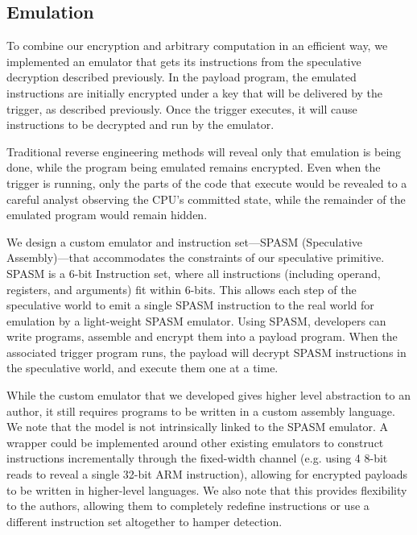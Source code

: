 \subsection{Emulation}

To combine our encryption and arbitrary computation in an efficient way, we
implemented an emulator that gets its instructions from the speculative
decryption described previously. In the payload program, the emulated
instructions are initially encrypted under a key that will be delivered by the
trigger, as described previously. Once the trigger executes, it will cause
instructions to be decrypted and run by the emulator.

Traditional reverse engineering methods will reveal only that
emulation is being done, while the program being emulated remains encrypted.
Even when the trigger is running, only the parts of the code that execute would
be revealed to a careful analyst observing the CPU's committed state, while the
remainder of the emulated program would remain hidden.

We design a custom emulator and instruction set---SPASM (Speculative
Assembly)---that accommodates the constraints of our speculative primitive.
SPASM is a 6-bit Instruction set, where all instructions (including operand,
registers, and arguments) fit within 6-bits. This allows each step of the
speculative world to emit a single SPASM instruction to the real world for
emulation by a light-weight SPASM emulator. Using SPASM, developers can write
programs, assemble and encrypt them into a payload program. When the
associated trigger program runs, the payload will decrypt SPASM instructions in
the speculative world, and execute them one at a time.



While the custom emulator that we developed gives higher level abstraction to
an author, it still requires programs to be written in a custom assembly language. 
We note that the \speculake model is not intrinsically linked to the SPASM emulator. 
A wrapper could be implemented around other existing emulators to construct
instructions incrementally through the fixed-width channel (e.g. using 4 8-bit
reads to reveal a single 32-bit ARM instruction), allowing for encrypted
payloads to be written in higher-level languages. We also note that this
provides flexibility to the authors, allowing them to completely redefine
instructions or use a different instruction set altogether to hamper detection.
